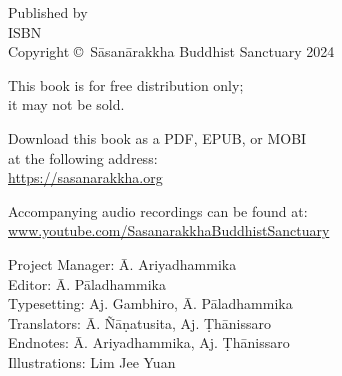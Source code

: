 
\cleartoverso
\thispagestyle{empty}


{%

	\ifafiveversion \fontsize{10}{16}\selectfont \fi
	\ifasixversion \fontsize{7.5}{11}\selectfont \fi
	\centering
	\setlength{\parindent}{0pt}%

	\ifafiveversion \vspace{0.5cm} \fi

	Published by \publisher\\

	ISBN \theISBN\\
	Copyright \copyright\ Sāsanārakkha Buddhist Sanctuary 2024

	\ifafiveversion \vspace{0.5cm} \fi
	\ifasixversion \vspace{0.4cm} \fi

	This book is for free distribution only;\\
	it may not be sold.

	\ifafiveversion \vspace{0.5cm} \fi
	\ifasixversion \vspace{0.4cm} \fi

	Download this book as a PDF, EPUB, or MOBI\\
	at the following address:\\
	\href{https://sasanarakkha.org/}{https://sasanarakkha.org}

	Accompanying audio recordings can be found at: 
	\href{www.youtube.com/SasanarakkhaBuddhistSanctuary}{www.youtube.com/SasanarakkhaBuddhistSanctuary}

	\ifafiveversion \vspace{0.5cm} \fi
	\ifasixversion \vspace{0.4cm} \fi

	Project Manager: Ā. Ariyadhammika\\
	Editor: Ā. Pāladhammika\\
	Typesetting: Aj. Gambhiro, Ā. Pāladhammika\\
	Translators: Ā. Ñāṇatusita, Aj. Ṭhānissaro\\
	Endnotes: Ā. Ariyadhammika, Aj. Ṭhānissaro\\
	Illustrations: Lim Jee Yuan

	\ifafiveversion \vspace{0.5cm} \fi
	\ifasixversion \vspace{0.4cm} \fi

}
